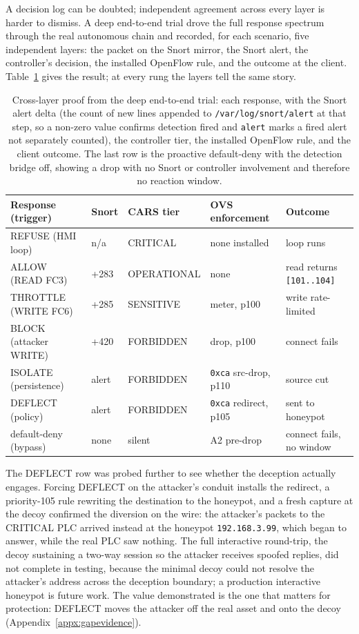 A decision log can be doubted; independent agreement across every layer is harder to dismiss. A deep end-to-end trial drove the full response spectrum through the real autonomous chain and recorded, for each scenario, five independent layers: the packet on the Snort mirror, the Snort alert, the controller's decision, the installed OpenFlow rule, and the outcome at the client. Table~\ref{tab:crosslayer} gives the result; at every rung the layers tell the same story.

\begin{table}[t]
\centering
\small
\begin{tabular}{lllll}
\hline
Response (trigger) & Snort & CARS tier & OVS enforcement & Outcome \\
\hline
REFUSE (HMI loop) & n/a & CRITICAL & none installed & loop runs \\
ALLOW (READ FC3) & +283 & OPERATIONAL & none & read returns \texttt{[101..104]} \\
THROTTLE (WRITE FC6) & +285 & SENSITIVE & meter, p100 & write rate-limited \\
BLOCK (attacker WRITE) & +420 & FORBIDDEN & drop, p100 & connect fails \\
ISOLATE (persistence) & alert & FORBIDDEN & \texttt{0xca} src-drop, p110 & source cut \\
DEFLECT (policy) & alert & FORBIDDEN & \texttt{0xca} redirect, p105 & sent to honeypot \\
default-deny (bypass) & none & silent & A2 pre-drop & connect fails, no window \\
\hline
\end{tabular}
\caption[Cross-layer proof of each response]{Cross-layer proof from the deep end-to-end trial: each response, with the Snort alert delta (the count of new lines appended to \texttt{/var/log/snort/alert} at that step, so a non-zero value confirms detection fired and \texttt{alert} marks a fired alert not separately counted), the controller tier, the installed OpenFlow rule, and the client outcome. The last row is the proactive default-deny with the detection bridge off, showing a drop with no Snort or controller involvement and therefore no reaction window.}
\label{tab:crosslayer}
\end{table}

The DEFLECT row was probed further to see whether the deception actually engages. Forcing DEFLECT on the attacker's conduit installs the redirect, a priority-105 rule rewriting the destination to the honeypot, and a fresh capture at the decoy confirmed the diversion on the wire: the attacker's packets to the CRITICAL PLC arrived instead at the honeypot \texttt{192.168.3.99}, which began to answer, while the real PLC saw nothing. The full interactive round-trip, the decoy sustaining a two-way session so the attacker receives spoofed replies, did not complete in testing, because the minimal decoy could not resolve the attacker's address across the deception boundary; a production interactive honeypot is future work. The value demonstrated is the one that matters for protection: DEFLECT moves the attacker off the real asset and onto the decoy (Appendix~\ref{appx:gapevidence}).

